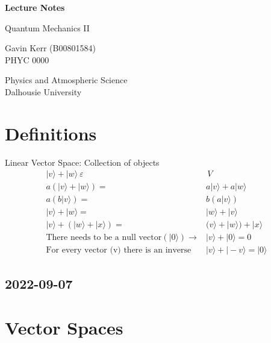 \documentclass[12pt]{article}
\begin{document}
\begin{titlepage}
   \begin{center}
       \vspace*{0.5cm}

       \LARGE{\textbf{Lecture Notes}}

       \vspace{1cm}
        \Large{Quantum Mechanics II}
            
       \vspace{1cm}
		\small{Gavin Kerr (B00801584)} \\
		\vfill
       \vfill
           \large{ PHYC 0000}
            
       \vspace{0.8cm}
     
            
       Physics and Atmospheric Science\\
       Dalhousie University\\
            
   \end{center}
\end{titlepage}


\section{Definitions}
Linear Vector Space: Collection of objects
\begin{align*}
|v\rangle + |w\rangle \ \varepsilon& \, V
\\
a(|v\rangle + |w\rangle) =& a|v\rangle + a|w\rangle
\\
a(b|v\rangle) =& b(a|v\rangle)
\\
|v\rangle + |w\rangle =& |w\rangle + |v\rangle
\\
|v\rangle + (|w\rangle + |x\rangle) =& 
(v\rangle + |w\rangle) + |x\rangle
\\
\text{There needs to be a null vector} (|0\rangle) \rightarrow& |v\rangle + |0\rangle = 0 
\\
\text{For every vector (v) there is an inverse} &
|v\rangle + |-v\rangle = |0\rangle
\end{align*}


\subsection*{2022-09-07}

\section{Vector Spaces}
\end{document}
